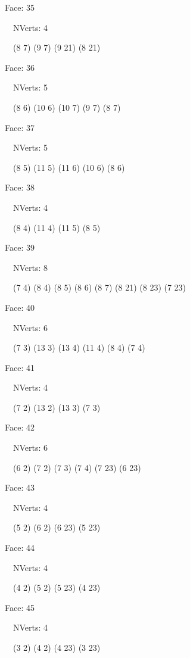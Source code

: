 \documentclass{article}
\begin{document}
{\footnotesize 

Face: 35

\   \    NVerts: 4

 \   \   (8 7) (9 7) (9 21) (8 21)}

{\footnotesize 

Face: 36

\   \    NVerts: 5

 \   \   (8 6) (10 6) (10 7) (9 7) (8 7)}

{\footnotesize 

Face: 37

\   \    NVerts: 5

 \   \   (8 5) (11 5) (11 6) (10 6) (8 6)}

{\footnotesize 

Face: 38

\   \    NVerts: 4

 \   \   (8 4) (11 4) (11 5) (8 5)}

{\footnotesize 

Face: 39

\   \    NVerts: 8

 \   \   (7 4) (8 4) (8 5) (8 6) (8 7) (8 21) (8 23) (7 23)}

{\footnotesize 

Face: 40

\   \    NVerts: 6

 \   \   (7 3) (13 3) (13 4) (11 4) (8 4) (7 4)}

{\footnotesize 

Face: 41

\   \    NVerts: 4

 \   \   (7 2) (13 2) (13 3) (7 3)}

{\footnotesize 

Face: 42

\   \    NVerts: 6

 \   \   (6 2) (7 2) (7 3) (7 4) (7 23) (6 23)}

{\footnotesize 

Face: 43

\   \    NVerts: 4

 \   \   (5 2) (6 2) (6 23) (5 23)}

{\footnotesize 

Face: 44

\   \    NVerts: 4

 \   \   (4 2) (5 2) (5 23) (4 23)}

{\footnotesize 

Face: 45

\   \    NVerts: 4

 \   \   (3 2) (4 2) (4 23) (3 23)}
\end{document}
